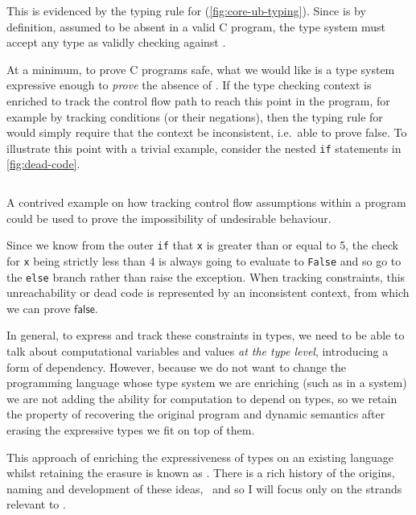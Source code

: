 This is evidenced by the typing rule for  %
(\cref{fig:core-ub-typing}). Since  is by definition, assumed to be
absent in a valid C program, the type system must accept any type as validly
checking against . %

At a minimum, to prove C programs safe, what we would like is a type system
expressive enough to \emph{prove} the absence of . If the type checking
context is enriched to track the control flow path to reach this point in the
program, for example by tracking conditions (or their negations), then the
typing rule for  would simply require that the context %
be inconsistent, i.e.\ able to prove false. To illustrate this point with
a trivial example, consider the nested \texttt{if} statements in
\cref{fig:dead-code}.

\begin{marginfigure}
    \inputminted[breaklines,mathescape,fontsize=\small]{py}{code/dead_code.py}
    \caption{A contrived example on how tracking control flow assumptions
        within a program could be used to prove the impossibility of
        undesirable behaviour.}\label{fig:dead-code}
\end{marginfigure}

Since we know from the outer \texttt{if} that \texttt{x} is
greater than or equal to 5, the check for \texttt{x} being strictly
less than 4 is always going to evaluate to \texttt{False} and so go to
the \texttt{else} branch rather than raise the exception. When tracking
constraints, this unreachability or dead code is represented by an inconsistent
context, from which we can prove $\mathsf{false}$.

In general, to express and track these constraints in types, we need to be able
to talk about computational variables and values \emph{at the type level},
introducing a form of dependency. However, because we do not want to change the
programming language whose type system we are enriching (such as in a
 system) we are not adding the ability for computation to
depend on types, so we retain the property of recovering the original program
and dynamic semantics after erasing the expressive types we fit on top of them.

This approach of enriching the expressiveness of types on an existing language
whilst retaining the erasure is known as . There is a
rich history of the origins, naming and development of these
ideas,~ and so I will focus only on the strands
relevant to .

